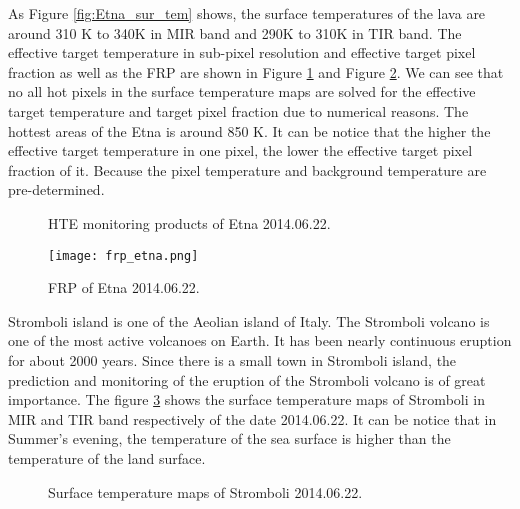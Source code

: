 \noindent As Figure \ref{fig:Etna_sur_tem} shows, the surface temperatures of the lava are around 310 K to 340K in MIR band and 290K to 310K in TIR band. The effective target temperature in sub-pixel resolution and effective target pixel fraction as well as the FRP are shown in Figure \ref{fig:Etna_HTE} and Figure \ref{fig:Etna_frp}. We can see that no all hot pixels in the surface temperature maps are solved for the effective target temperature and target pixel fraction due to numerical reasons. The hottest areas of the Etna is around 850 K. It can be notice that the higher the effective target temperature in one pixel, the lower the effective target pixel fraction of it. Because the pixel temperature and background temperature are pre-determined.\\

\begin{figure}[!htbp]
\centering
{}
\hspace{0.1in}
\caption{HTE monitoring products of Etna 2014.06.22.}
\label{fig:Etna_HTE}
\end{figure}

\begin{figure}[!htbp]
\centering
\texttt{[image: frp\_etna.png]}
\caption{FRP of Etna 2014.06.22.}
\label{fig:Etna_frp}
\end{figure}

\noindent Stromboli island is one of the Aeolian island of Italy. The Stromboli volcano is one of the most active volcanoes on Earth. It has been nearly continuous eruption for about 2000 years. Since there is a small town in Stromboli island, the prediction and monitoring of the eruption of the Stromboli volcano is of great importance. The figure \ref{fig:Strom_sur_tem} shows the surface temperature maps of Stromboli in MIR and TIR band respectively of the date 2014.06.22. It can be notice that in Summer's evening, the temperature of the sea surface is higher than the temperature of the land surface.\\

\begin{figure}
\centering
{}
\hspace{0.1in}
\caption{Surface temperature maps of Stromboli 2014.06.22.}
\label{fig:Strom_sur_tem}
\end{figure}

